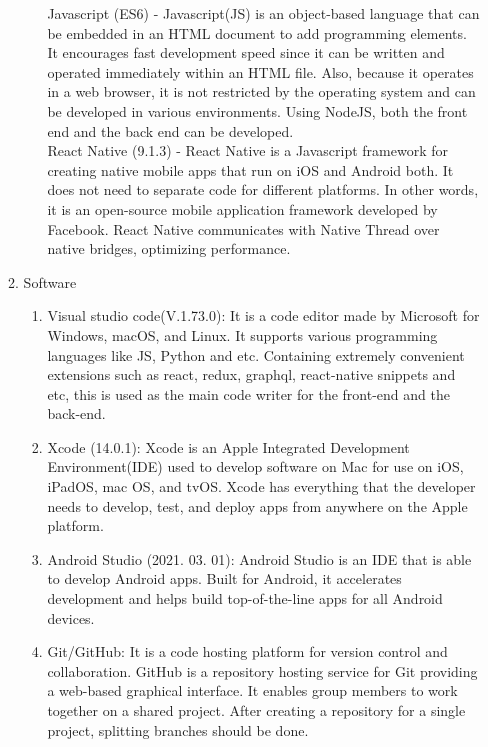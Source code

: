 \documentclass[conference]{IEEEtran}
\begin{document}
\begin{enumerate}[label=\arabic*.]
\begin{enumerate}[label=\alph*.]
\begin{enumerate}[label=\roman*.]
            Javascript (ES6) - Javascript(JS) is an object-based language that can be embedded in an HTML document to add programming elements. It encourages fast development speed since it can be written and operated immediately within an HTML file. Also, because it operates in a web browser, it is not restricted by the operating system and can be developed in various environments. Using NodeJS, both the front end and the back end can be developed. \\
            React Native (9.1.3) - React Native is a Javascript framework for creating native mobile apps that run on iOS and Android both. It does not need to separate code for different platforms. In other words, it is an open-source mobile application framework developed by Facebook. React Native communicates with Native Thread over native bridges, optimizing performance. \\
        \end{enumerate}
        \item {\large{Software}} \\
        \begin{enumerate}[label=\roman*.]
            \item {\large{Visual studio code(V.1.73.0): It is a code editor made by Microsoft for Windows, macOS, and Linux. It supports various programming languages like JS, Python and etc. Containing extremely convenient extensions such as react, redux, graphql, react-native snippets and etc, this is used as the main code writer for the front-end and the back-end.}} \\
            \item {\large{Xcode (14.0.1): Xcode is an Apple Integrated Development Environment(IDE) used to develop software on Mac for use on iOS, iPadOS, mac OS, and tvOS. Xcode has everything that the developer needs to develop, test, and deploy apps from anywhere on the Apple platform.}} \\
            \item {\large{Android Studio (2021. 03. 01): Android Studio is an IDE that is able to develop Android apps. Built for Android, it accelerates development and helps build top-of-the-line apps for all Android devices.}} \\
            \item {\large{Git/GitHub: It is a code hosting platform for version control and collaboration. GitHub is a repository hosting service for Git providing a web-based graphical interface. It enables group members to work together on a shared project. After creating a repository for a single project, splitting branches should be done.  }} \\ 

\end{enumerate}
\end{enumerate}
\end{enumerate}
\end{document}
